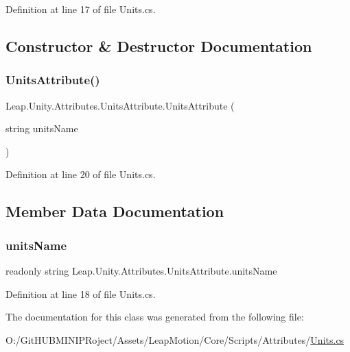 Definition at line 17 of file Units.\+cs.



\subsection{Constructor \& Destructor Documentation}
\mbox{\label{class_leap_1_1_unity_1_1_attributes_1_1_units_attribute_a80e332e4a8268c37e1c90ce5b49fe0f1}} 
\subsubsection{\texorpdfstring{UnitsAttribute()}{UnitsAttribute()}}
{\footnotesize\ttfamily Leap.\+Unity.\+Attributes.\+Units\+Attribute.\+Units\+Attribute (\begin{DoxyParamCaption}\item[{string}]{units\+Name }\end{DoxyParamCaption})}



Definition at line 20 of file Units.\+cs.



\subsection{Member Data Documentation}
\mbox{\label{class_leap_1_1_unity_1_1_attributes_1_1_units_attribute_a58a9a2fd9ed58c81f9e3beeb637b8a74}} 
\subsubsection{\texorpdfstring{unitsName}{unitsName}}
{\footnotesize\ttfamily readonly string Leap.\+Unity.\+Attributes.\+Units\+Attribute.\+units\+Name}



Definition at line 18 of file Units.\+cs.



The documentation for this class was generated from the following file\+:\begin{DoxyCompactItemize}
\item 
O\+:/\+Git\+H\+U\+B\+M\+I\+N\+I\+P\+Roject/\+Assets/\+Leap\+Motion/\+Core/\+Scripts/\+Attributes/\mbox{\hyperlink{_units_8cs}{Units.\+cs}}\end{DoxyCompactItemize}
